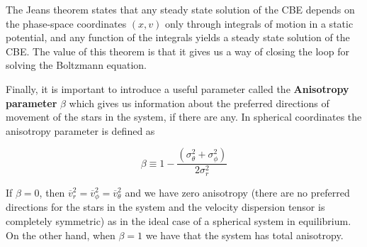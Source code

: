 The Jeans theorem states that any steady state solution of the CBE depends on the phase-space coordinates $(x,v)$ only through integrals of motion in a static potential, and any function of the integrals yields a steady state solution of the CBE. The value of this theorem is that it gives us a way of closing the loop for solving the Boltzmann equation. 

Finally, it is important to introduce a useful parameter called the \textbf{Anisotropy parameter} $\beta$ which gives us information about the preferred directions of movement of the stars in the system, if there are any. In spherical coordinates the anisotropy parameter is defined as

\begin{equation}
\beta \equiv 1-\frac{\left(\sigma_{\theta}^{2}+\sigma_{\phi}^{2}\right)}{2\sigma_{r}^{2}}
\end{equation}

If $\beta=0$, then $\overline{v}_{r}^{2}=\overline{v}_{\phi}^{2}=\overline{v}_{\theta}^{2}$ and we have zero anisotropy (there are no preferred directions for the stars in the system and the velocity dispersion tensor is completely symmetric) as in the ideal case of a spherical system in equilibrium. On the other hand, when $\beta=1$ we have that the system has total anisotropy.

